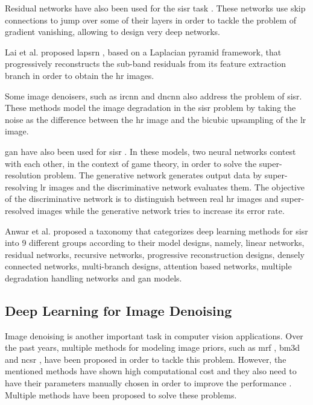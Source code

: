 Residual networks have also been used for the \gls{sisr} task \cite{EDSR}\cite{REDNET}. These networks use skip connections to jump over some of their layers in order to tackle the problem of gradient vanishing, allowing to design very deep networks.

Lai et al. proposed \gls{lapsrn} \cite{LAPSRN}\cite{LAPSRN2}, based on a Laplacian pyramid framework, that progressively reconstructs the sub-band residuals from its feature extraction branch in order to obtain the \gls{hr} images. 

Some image denoisers, such as \gls{ircnn} \cite{IRCNN} and \gls{dncnn} \cite{DNCNN} also address the problem of \gls{sisr}. These methods model the image degradation in the \gls{sisr} problem by taking the noise as the difference between the \gls{hr} image and the bicubic upsampling of the \gls{lr} image.
 
\gls{gan} have also been used for \gls{sisr} \cite{SRGAN}. In these models, two neural networks contest with each other, in the context of game theory, in order to solve the super-resolution problem. The generative network generates output data by super-resolving \gls{lr} images and the discriminative network evaluates them. The objective of the discriminative network is to distinguish between real \gls{hr} images and super-resolved images while the generative network tries to increase its error rate.

Anwar et al. \cite{DBLP:SISR} proposed a taxonomy that categorizes deep learning methods for \gls{sisr} into 9 different groups according to their model designs, namely, linear networks, residual networks, recursive networks, progressive reconstruction designs, densely connected networks, multi-branch designs, attention based networks, multiple degradation handling networks and \gls{gan} models.

\subsection{Deep Learning for Image Denoising}
Image denoising is another important task in computer vision applications. Over the past years, multiple methods for modeling image priors, such as \gls{mrf} \cite{MRF}, \gls{bm3d} \cite{BM3D} and \gls{ncsr} \cite{NCSR}, have been proposed in order to tackle this problem. However, the mentioned methods have shown high computational cost and they also need to have their parameters manually chosen in order to improve the performance \cite{DBLP:DEEPNR}. Multiple methods have been proposed to solve these problems. 

